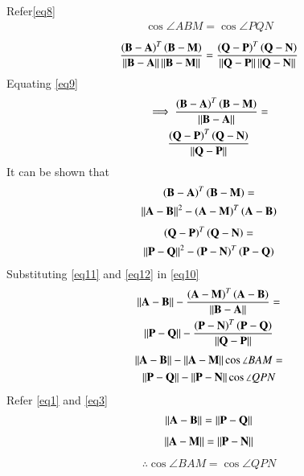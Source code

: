 \documentclass[journal,12pt,twocolumn]{IEEEtran}
\begin{document}
Refer\eqref{eq8}\\
\begin{align}
\cos \angle ABM=\cos \angle PQN    
\end{align}
\begin{align}
\frac{\left( \mathbf{ B - A} \right)^T  \left( \mathbf{B - M } \right)}{\left\lVert\mathbf{ B - A}\right\rVert \left\lVert\mathbf{B - M}\right\rVert}=\frac{\left( \mathbf{ Q - P} \right)^T  \left( \mathbf{Q - N} \right)}{\left\lVert\mathbf{ Q - P}\right\rVert \left\lVert\mathbf{Q - N}\right\rVert}
\end{align}
Equating \eqref{eq9}
\begin{multline}
\label {eq10} 
\implies\frac{\left( \mathbf{ B - A} \right)^T  \left( \mathbf{B - M} \right)}{\left\lVert\mathbf{ B - A}\right\rVert}=\\
\frac{\left( \mathbf{ Q - P} \right)^T  \left( \mathbf{Q - N } \right)}{\left\lVert\mathbf{ Q - P}\right\rVert}
\end{multline}
It can be shown that
\begin{multline}
\label{eq11}
 \left( \mathbf{ B - A} \right)^T  \left( \mathbf{B - M} \right)=\\
 \left\lVert\mathbf{A - B}\right\rVert^2 - \left ( \mathbf{  A - M  }\right)^T \left( \mathbf{A - B} \right)
 \end{multline}
 \begin{multline}
 \label{eq12}
 \left( \mathbf{ Q - P} \right)^T  \left( \mathbf{ Q- N } \right)=\\
 \left\lVert\mathbf{P - Q}\right\rVert^2 - \left ( \mathbf{  P - N  }\right)^T \left( \mathbf{P - Q} \right)
\end{multline}
Substituting \eqref{eq11} and \eqref{eq12} in \eqref{eq10}
\begin{multline}
\left\lVert\mathbf{A - B}\right\rVert- \frac{\left( \mathbf{ A - M} \right)^T \left( \mathbf{A - B} \right)}{\left\lVert\mathbf{ B - A}\right\rVert} =\\ \left\lVert\mathbf{P - Q}\right\rVert- \frac{\left( \mathbf{ P - N} \right)^T \left( \mathbf{P- Q} \right)}{\left\lVert\mathbf{ Q - P}\right\rVert}
\end{multline}
\begin{multline}
\left\lVert\mathbf{A - B}\right\rVert- \left\lVert\mathbf{A - M}\right\rVert\cos\angle BAM =\\  \left\lVert\mathbf{P - Q}\right\rVert- \left\lVert\mathbf{P - N}\right\rVert\cos\angle QPN   
\end{multline}
 Refer \eqref{eq1} and \eqref{eq3}
\begin{align}
\left\lVert\mathbf{A - B}\right\rVert= \left\lVert\mathbf{P - Q}\right\rVert
\end{align}
\begin{align}
\left\lVert\mathbf{A - M}\right\rVert= \left\lVert\mathbf{P - N}\right\rVert
\end{align}
\begin{align}
\therefore \cos\angle BAM =  \cos\angle QPN
\end{align}
\end{document}
